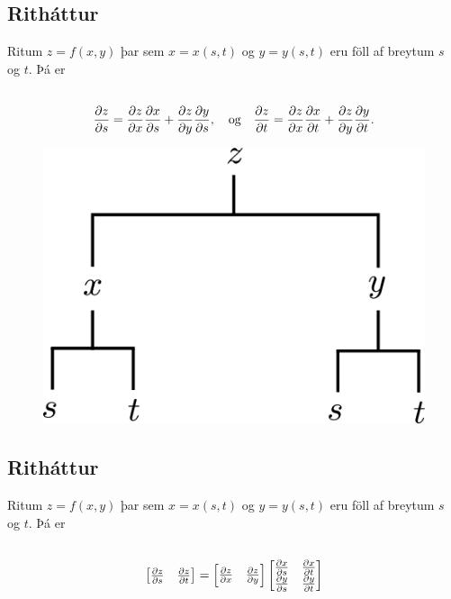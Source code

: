 \documentclass[a4paper,10pt,icelandic]{sphinxmanual}
\begin{document}
\subsection{Ritháttur}
\label{Kafli2:id20}
Ritum \(z=f(x,y)\) þar sem \(x=x(s,t)\) og \(y=y(s,t)\) eru
föll af breytum \(s\) og \(t\). Þá er
\begin{gather}
\begin{split}\displaystyle\end{split}\notag\\\begin{split}\frac{\partial z}{\partial s}=
\frac{\partial z}{\partial x}\frac{\partial x}{\partial s}
+\frac{\partial z}{\partial y}\frac{\partial y}{\partial s}, \quad \text{og}\quad \frac{\partial z}{\partial t}=
\frac{\partial z}{\partial x}\frac{\partial x}{\partial t}
+\frac{\partial z}{\partial y}\frac{\partial y}{\partial t}.\end{split}\notag
\end{gather}\begin{figure}[htbp]
\centering

\includegraphics[width=0.300\linewidth]{chain2.png}
\end{figure}


\subsection{Ritháttur}
\label{Kafli2:id21}
Ritum \(z=f(x,y)\) þar sem \(x=x(s,t)\) og \(y=y(s,t)\) eru
föll af breytum \(s\) og \(t\). Þá er
\begin{gather}
\begin{split}\displaystyle\end{split}\notag\\\begin{split}\begin{bmatrix}\frac{\partial z}{\partial s}
& \frac{\partial z}{\partial t}\end{bmatrix}
=\begin{bmatrix}\frac{\partial z}{\partial x}
& \frac{\partial z}{\partial y}\end{bmatrix}
\begin{bmatrix}\frac{\partial x}{\partial s}
& \frac{\partial x}{\partial t}\\
\frac{\partial y}{\partial s}
& \frac{\partial y}{\partial t}
\end{bmatrix}\end{split}\notag
\end{gather}
\end{document}
